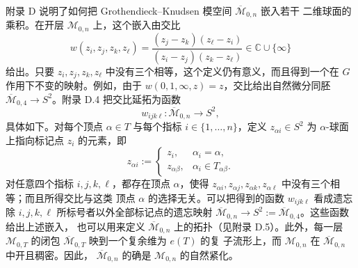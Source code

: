 附录 D 说明了如何把 Grothendieck--Knudsen 模空间 $\overline{\mathcal M}_{0,n}$ 嵌入若干
二维球面的乘积。在开层 $\mathcal M_{0,n}$ 上，这个嵌入由交比
\[
  w(z_i,z_j,z_k,z_\ell)
  =\frac{(z_j-z_k)(z_\ell-z_i)}{(z_i-z_j)(z_k-z_\ell)}
  \in\mathbb C\cup\{\infty\}
\]
给出。只要 $z_i,z_j,z_k,z_\ell$ 中没有三个相等，这个定义仍有意义，而且得到一个在 $G$
作用下不变的映射。例如，由于 $w(0,1,\infty,z)=z$，交比给出自然微分同胚
$\overline{\mathcal M}_{0,4}\to S^2$。附录 D.4 把交比延拓为函数
\[
  w_{ijk\ell}:\overline{\mathcal M}_{0,n}\longrightarrow S^2,
\]
具体如下。对每个顶点 $\alpha\in T$ 与每个指标 $i\in\{1,\ldots,n\}$，定义
$z_{\alpha i}\in S^2$ 为 $\alpha$-球面上指向标记点 $z_i$ 的元素，即
\begin{equation}\label{eq:5-1-6}
  z_{\alpha i}:=
  \begin{cases}
    z_i, & \alpha_i=\alpha,\\
    z_{\alpha\beta}, & \alpha_i\in T_{\alpha\beta}.
  \end{cases}
\end{equation}
对任意四个指标 $i,j,k,\ell$，都存在顶点 $\alpha$，使得
$z_{\alpha i},z_{\alpha j},z_{\alpha k},z_{\alpha\ell}$ 中没有三个相等；而且所得交比与这类
顶点 $\alpha$ 的选择无关。可以把得到的函数 $w_{ijk\ell}$ 看成遗忘除
$i,j,k,\ell$ 所标号者以外全部标记点的遗忘映射
$\overline{\mathcal M}_{0,n}\to S^2:=\overline{\mathcal M}_{0,4}$。这些函数给出上述嵌入，
也可以用来定义 $\overline{\mathcal M}_{0,n}$ 上的拓扑（见附录 D.5）。此外，每一层
$\mathcal M_{0,T}$ 的闭包 $\overline{\mathcal M}_{0,T}$ 映到一个复余维为 $e(T)$ 的复
子流形上，而 $\mathcal M_{0,n}$ 在 $\overline{\mathcal M}_{0,n}$ 中开且稠密。因此，
$\overline{\mathcal M}_{0,n}$ 的确是 $\mathcal M_{0,n}$ 的自然紧化。

